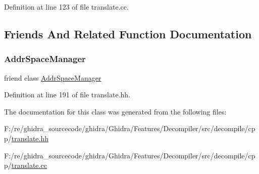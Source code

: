Definition at line 123 of file translate.\+cc.



\subsection{Friends And Related Function Documentation}
\mbox{\label{class_join_record_a0e578f3e90e10ec045899c0e9cb65d46}} 
\subsubsection{\texorpdfstring{AddrSpaceManager}{AddrSpaceManager}}
{\footnotesize\ttfamily friend class \mbox{\hyperlink{class_addr_space_manager}{Addr\+Space\+Manager}}\hspace{0.3cm}{\ttfamily [friend]}}



Definition at line 191 of file translate.\+hh.



The documentation for this class was generated from the following files\+:\begin{DoxyCompactItemize}
\item 
F\+:/re/ghidra\+\_\+sourcecode/ghidra/\+Ghidra/\+Features/\+Decompiler/src/decompile/cpp/\mbox{\hyperlink{translate_8hh}{translate.\+hh}}\item 
F\+:/re/ghidra\+\_\+sourcecode/ghidra/\+Ghidra/\+Features/\+Decompiler/src/decompile/cpp/\mbox{\hyperlink{translate_8cc}{translate.\+cc}}\end{DoxyCompactItemize}
